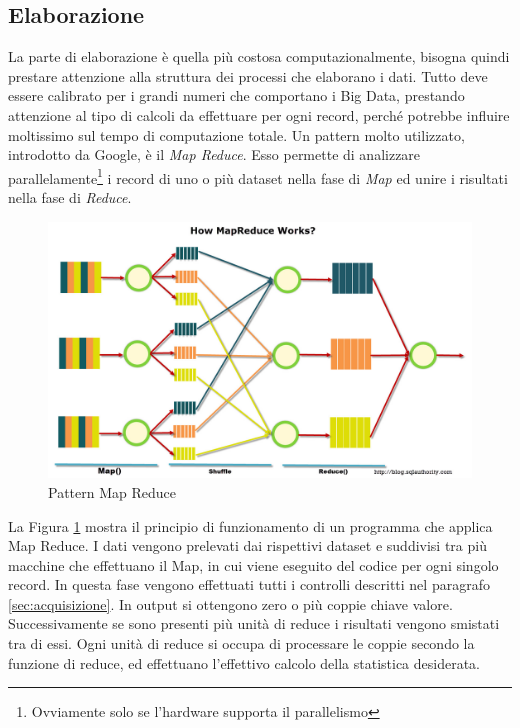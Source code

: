 \subsection{Elaborazione}\label{sec:elaborazione}
La parte di elaborazione è quella più costosa computazionalmente, bisogna quindi prestare attenzione alla struttura dei processi che elaborano i dati. Tutto deve essere calibrato per i grandi numeri che comportano i Big Data, prestando attenzione al tipo di calcoli da effettuare per ogni record, perché potrebbe influire moltissimo sul tempo di computazione totale. Un pattern molto utilizzato, introdotto da Google, è il \emph{Map Reduce}. \label{sec:mapreduce}
Esso permette di analizzare parallelamente\footnote{Ovviamente solo se l'hardware supporta il parallelismo} i record di uno o più dataset nella fase di \emph{Map} ed unire i risultati nella fase di \emph{Reduce}.
\begin{figure}[ht!]
	\label{img:mapreduce}
	\centering
	\includegraphics[width=\textwidth]{img/mapreduce.jpg}
	\caption{Pattern Map Reduce}
\end{figure}
La Figura \ref{img:mapreduce} mostra il principio di funzionamento di un programma che applica Map Reduce. I dati vengono prelevati dai rispettivi dataset e suddivisi tra più macchine che effettuano il Map, in cui viene eseguito del codice per ogni singolo record. In questa fase vengono effettuati tutti i controlli descritti nel paragrafo \ref{sec:acquisizione}. In output si ottengono zero o più coppie chiave valore. Successivamente se sono presenti più unità di reduce i risultati vengono smistati tra di essi. Ogni unità di reduce si occupa di processare le coppie secondo la funzione di reduce, ed effettuano l'effettivo calcolo della statistica desiderata.



